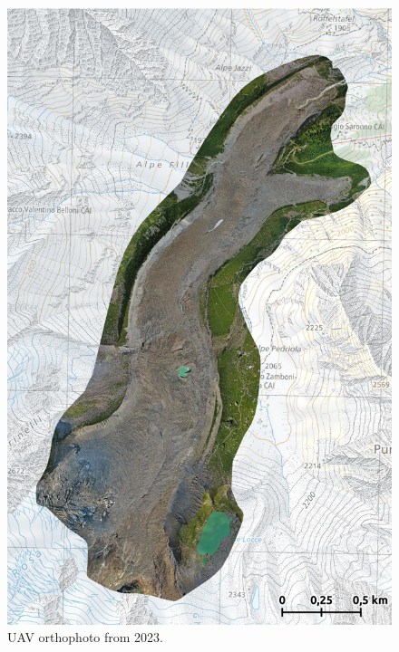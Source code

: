 \begin{figure}[p]
    \centering
    \includegraphics[height=\textheight]{figures/appendix/orto_2023.jpg}
    \caption{UAV orthophoto from 2023.}
\end{figure}



